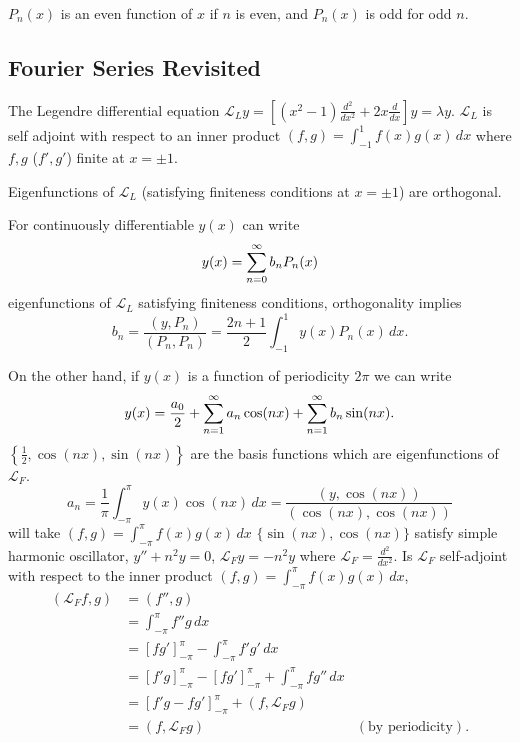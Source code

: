 \documentclass[10pt, a4paper]{article}
\begin{document}
\begin{remark}
    $P_n(x)$ is an even function of $x$ if $n$ is even,
    and $P_n(x)$ is odd for odd $n$.
\end{remark}

\subsection{Fourier Series Revisited}
The Legendre differential equation $\mathcal{L}_Ly = \left[(x ^ 2 - 1)\frac{d ^ 2}{dx ^ 2} + 2x\frac{d}{dx}\right]y = \lambda y$.
$\mathcal{L}_L$ is self adjoint with respect to an inner product $(f, g) = \int_{-1}^{1}f(x)g(x)\,dx$ where $f, g$
($f', g'$)
finite at $x = \pm 1$.

Eigenfunctions of $\mathcal{L}_L$
(satisfying finiteness conditions at $x = \pm 1$)
are orthogonal.

For continuously differentiable $y(x)$ can write
\[
y(x) = \infsum[n = 0]b_nP_n(x)
\]
eigenfunctions of $\mathcal{L}_L$ satisfying finiteness conditions,
orthogonality implies
\[
b_n = \frac{(y, P_n)}{(P_n, P_n)} = \frac{2n + 1}{2}\int_{-1}^{1}y(x)P_n(x)\,dx.
\]

On the other hand,
if $y(x)$ is a function of periodicity $2\pi$ we can write
\[
y(x) = \frac{a_0}{2} + \infsum[n = 1]a_n\cos(nx) + \infsum[n = 1]b_n\sin(nx).
\]
$\left\{\frac{1}{2}, \cos(nx), \sin(nx)\right\}$ are the basis functions which are eigenfunctions of $\mathcal{L}_F$.
\[
a_n = \frac{1}{\pi}\int_{-\pi}^{\pi}y(x)\cos(nx)\,dx = \frac{(y, \cos(nx))}{(\cos(nx), \cos(nx))}
\]
will take $(f, g) = \int_{-\pi}^{\pi}f(x)g(x)\,dx$
$\{\sin(nx), \cos(nx)\}$ satisfy simple harmonic oscillator,
$y'' + n ^ 2y = 0$,
$\mathcal{L}_Fy = -n ^ 2y$ where $\mathcal{L}_F = \frac{d ^ 2}{dx ^ 2}$.
Is $\mathcal{L}_F$ self-adjoint with respect to the inner product $(f, g) = \int_{-\pi}^{\pi}f(x)g(x)\,dx$,
\begin{align*}
    (\mathcal{L}_Ff, g) &= (f'', g) \\
    &= \int_{-\pi}^{\pi}f''g\,dx \\
    &= \left[fg'\right]_{-\pi}^{\pi} - \int_{-\pi}^{\pi}f'g'\,dx \\
    &= \left[f'g\right]_{-\pi}^{\pi} - \left[fg'\right]_{-\pi}^{\pi} + \int_{-\pi}^{\pi}fg''\,dx \\
    &= \left[f'g - fg'\right]_{-\pi}^{\pi} + (f, \mathcal{L}_Fg) \\
    &= (f, \mathcal{L}_Fg) &(\text{by periodicity}).
\end{align*}
\end{document}
